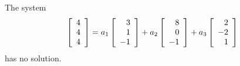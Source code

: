 \begin{enumialphparenastyle}
\begin{ex}
\begin{sol}
The system 
\begin{equation*}
\left[
\begin{array}{r}
4 \\
4 \\
4
\end{array}
\right]
=
a_1
\left[
\begin{array}{r}
3 \\
1 \\
-1
\end{array}
\right]
+a_2
\left[
\begin{array}{r}
8 \\
0\\
-1
\end{array}
\right]
+a_3
\left[
\begin{array}{r}
2 \\
-2\\
1
\end{array}
\right]
\end{equation*}
has no solution.
\end{sol}
\end{ex}

\end{enumialphparenastyle}